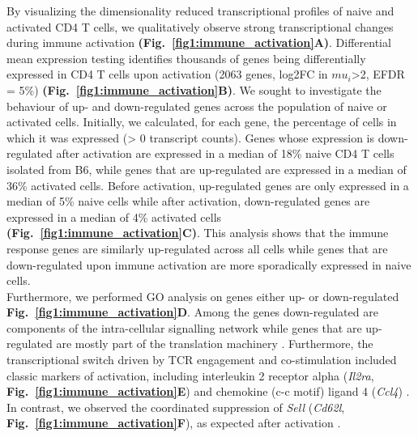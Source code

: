 By visualizing the dimensionality reduced transcriptional profiles of naive and activated CD4\plus{} T cells, we qualitatively observe strong transcriptional changes during immune activation \textbf{(Fig.~\ref{fig1:immune_activation}A)}. Differential mean expression testing identifies thousands of genes being differentially expressed in CD4\plus{} T cells upon activation (2063 genes, log2FC in $mu_i$>2, EFDR = 5\%) \textbf{(Fig.~\ref{fig1:immune_activation}B)}. We sought to investigate the behaviour of up- and down-regulated genes across the population of naive or activated cells. Initially, we calculated, for each gene, the percentage of cells in which it was expressed (> 0 transcript counts). Genes whose expression is down-regulated after activation are expressed in a median of 18\% naive CD4\plus{} T cells isolated from B6, while genes that are up-regulated are expressed in a median of 36\% activated cells. Before activation, up-regulated genes are only expressed in a median of 5\% naive cells while after activation, down-regulated genes are expressed in a median of 4\% activated cells \textbf{(Fig.~\ref{fig1:immune_activation}C)}. This analysis shows that the immune response genes are similarly up-regulated across all cells while genes that are down-regulated upon immune activation are more sporadically expressed in naive cells. \\

Furthermore, we performed GO analysis on genes either up- or down-regulated \textbf{Fig.~\ref{fig1:immune_activation}D}. Among the genes down-regulated are components of the intra-cellular signalling network while genes that are up-regulated are mostly part of the translation machinery \citep{Bjur2013}. Furthermore, the transcriptional switch driven by TCR engagement and co-stimulation included classic markers of activation, including interleukin 2 receptor alpha (\textit{Il2ra}, \textbf{Fig.~\ref{fig1:immune_activation}E}) and chemokine (c-c motif) ligand 4 (\textit{Ccl4}) \citep{Asmal2003}. In contrast, we observed the coordinated suppression of \textit{Sell} (\textit{Cd62l}, \textbf{Fig.~\ref{fig1:immune_activation}F}), as expected after activation \citep{Park2005}.

\newpage

